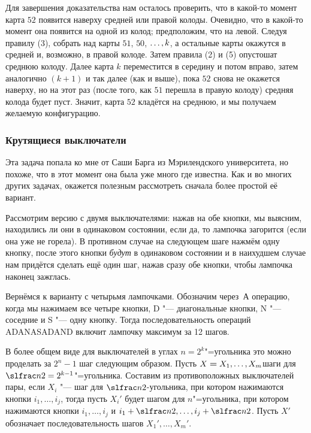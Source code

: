 \documentclass[twoside]{book}
\begin{document}
Для завершения доказательства нам осталось проверить, что в какой-то момент карта $52$ появится наверху средней или правой колоды.
Очевидно, что в какой-то момент она появится на одной из колод;
предположим, что на левой.
Следуя правилу (3),  собрать над  карты $51$, $50$, $\z\dots, k$, а остальные карты окажутся в средней и, возможно, в правой колоде.
Затем правила (2) и (5) опустошат среднюю колоду.
Далее карта $k$ переместится в середину и потом вправо, затем аналогично $(k+1)$ и так далее (как и выше), пока $52$ снова не окажется наверху, но на этот раз (после того, как $51$ перешла в правую колоду) средняя колода будет пуст.
Значит, карта $52$ кладётся на среднюю, и мы получаем желаемую конфигурацию.

\subsubsection*{Крутящиеся выключатели}%

Эта задача попала ко мне от Саши Барга из Мэрилендского университета, но похоже, что в этот момент она была уже много где известна.
Как и во многих других задачах, окажется полезным рассмотреть сначала более простой её вариант.


Рассмотрим версию с двумя выключателями: нажав на обе кнопки, мы выясним, находились ли они в одинаковом состоянии,  если да, то лампочка загорится (если она уже не горела).
В противном случае на следующем шаге нажмём одну кнопку, после этого кнопки \emph{будут} в одинаковом состоянии и в наихудшем случае нам придётся сделать ещё один шаг, нажав сразу обе кнопки, чтобы лампочка наконец зажглась.

Вернёмся к варианту с четырьмя лампочками.
Обозначим через~А операцию, когда мы нажимаем все четыре кнопки, 
D "--- диагональные кнопки, 
N "--- соседние и 
S "--- одну кнопку.
Тогда последовательность операций ADANASADAND включит лампочку максимум за 12 шагов.

В более общем виде для выключателей в углах $n=2^k$"=угольника это можно проделать за $2^{n}-1$ шаг следующим образом.
Пусть $X\hm=X_1,\dots,X_m$шаги для $\slfrac n2=2^{k-1}$"=угольника.
Составим из противоположных выключателей пары,  если $X_i$ "--- шаг для $\slfrac n2$-угольника, при котором нажимаются кнопки $i_1,\dots,i_j$, тогда пусть $X_i'$ будет шагом для $n$"=угольника, при котором нажимаются кнопки $i_1,\dots,i_j$ и $i_1+\slfrac n2,\dots,i_j+\slfrac n2$.
Пусть $X'$ обозначает последовательность шагов $X_1',\dots,X_m'$.
\end{document}
